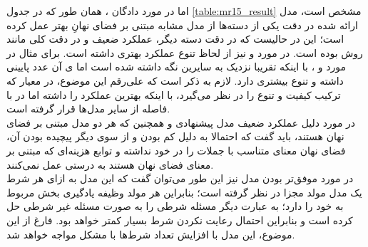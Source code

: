 اما در مورد دادگان \sst{}، همان طور که در جدول \ref{table:mr15_result} مشخص است، مدل ارائه شده در دقت یکی از دسته‌ها از مدل مشابه مبتنی بر فضای نهانِ \towardctg{} بهتر عمل کرده است؛ این در حالیست که در دقت دسته دیگر، عملکرد ضعیف و در دقت کلی مانند روش \towardctg{} بوده است. در مورد \bleu{} و \selfbleu{} نیز از لحاظ تنوع عملکرد بهتری داشته است. برای مثال در مورد \bleu[-5]{} و \selfbleu[-5]{}، با اینکه \bleu{} تقریبا نزدیک به سایرین نگه داشته شده است اما \selfbleu{}ی آن عدد پایینی داشته و تنوع بیشتری دارد. لازم به ذکر است که علی‌رقم این موضوع، در معیار \jaccard{} که ترکیب کیفیت و تنوع را در نظر می‌گیرد، با اینکه بهترین عملکرد \jaccard[-2]{} را داشته اما در \jaccard[-5]{} با فاصله از سایر مدل‌ها قرار گرفته است.
\\
در مورد دلیل عملکرد ضعیف مدل پیشنهادی و همچنین \towardctg{} که هر دو مدل مبتنی بر فضای نهان هستند، باید گفت که احتمالا به دلیل کم بودن و از سوی دیگر پیچیده بودن آن، فضای نهان معنای متناسب با جملات را در خود نداشته و توابع هزینه‌ای که مبتنی بر معنای فضای نهان هستند به درستی عمل نمی‌کنند.
\\
در مورد موفق‌تر بودن مدل \sentigan{} نیز این طور می‌توان گفت که این مدل به ازای هر شرط یک مدل مولد مجزا در نظر گرفته است؛ بنابراین هر مولد وظیفه یادگیری بخش مربوط به خود را دارد؛ به عبارت دیگر مسئله شرطی را به صورت مسئله غیر شرطی حل کرده است و بنابراین احتمال رعایت نکردن شرط بسیار کمتر خواهد بود. فارغ از این موضوع، این مدل با افزایش تعداد شرط‌ها با مشکل مواجه خواهد شد.

\iffalse
